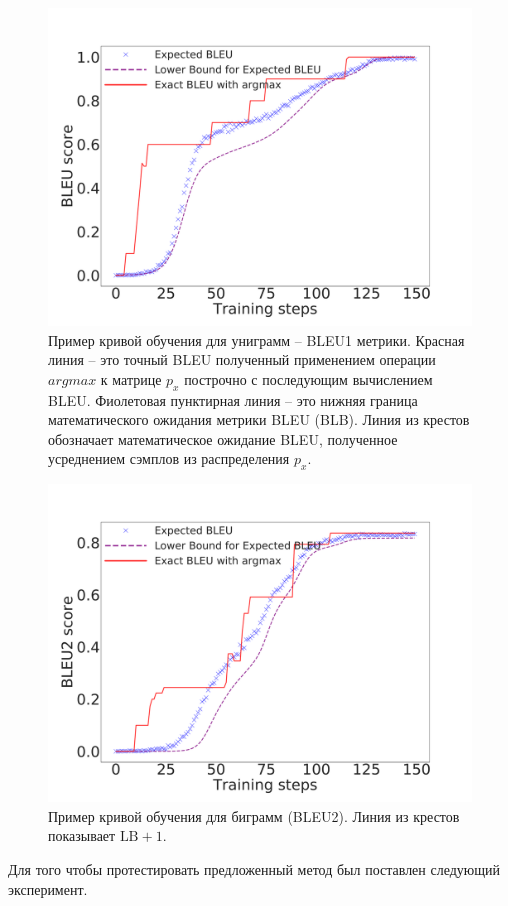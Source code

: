 \documentclass[14pt, a4paper]{extarticle}
\begin{document}
\begin{figure}[h]
  \centering
  \includegraphics[scale=0.28]{BLEU_old.pdf}
  \caption{Пример кривой обучения для униграмм -- BLEU1 метрики. Красная линия -- это точный BLEU полученный применением операции $argmax$ к матрице $p_x$ построчно с последующим вычислением BLEU. Фиолетовая пунктирная линия -- это нижняя граница математического ожидания метрики BLEU (BLB). Линия из крестов обозначает математическое ожидание BLEU, полученное усреднением сэмплов из распределения $p_x$.}
  \label{fig:bleu_toy}
\end{figure}

\begin{figure}[h]
  \centering
  \includegraphics[scale=0.28]{BLEU2_old.pdf}
  \caption{Пример кривой обучения для биграмм (BLEU2). Линия из крестов показывает $\textrm{LB}+1$.}
  \label{fig:bleu2_toy}
\end{figure}
Для того чтобы протестировать предложенный метод был поставлен следующий эксперимент.
\end{document}
